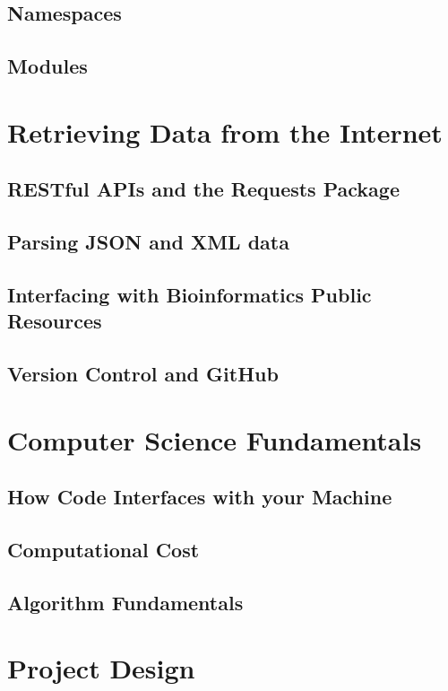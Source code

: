 \documentclass[a4paper,11pt]{article}
\begin{document}
\pagebreak
\subsection{Namespaces}

\pagebreak
\subsection{Modules}

\pagebreak
\section{Retrieving Data from the Internet}
\subsection{RESTful APIs and the Requests Package}

\pagebreak
\subsection{Parsing JSON and XML data}

\pagebreak
\subsection{Interfacing with Bioinformatics Public Resources}

\pagebreak
\subsection{Version Control and GitHub}

\pagebreak
\section{Computer Science Fundamentals}
\subsection{How Code Interfaces with your Machine}

\pagebreak
\subsection{Computational Cost}

\pagebreak
\subsection{Algorithm Fundamentals}

\pagebreak
\section{Project Design}
\end{document}
